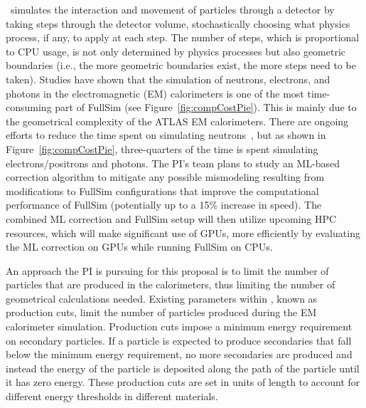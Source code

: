 \documentclass[letter, USenglish, 11pt, subfigure]{article}
\begin{document}
\GEANT\ simulates the interaction and movement of particles through a detector by taking steps through the detector volume, stochastically choosing what physics process, if any, to apply at each step. The number of steps, which is proportional to CPU usage, is not only determined by physics processes but also geometric boundaries (i.e., the more geometric boundaries exist, the more steps need to be taken). Studies have shown that the simulation of neutrons, electrons, and photons in the electromagnetic (EM) calorimeters is one of the most time-consuming part of FullSim (see Figure~\ref{fig:compCostPie}). This is mainly due to the geometrical complexity of the ATLAS EM calorimeters. There are ongoing efforts to reduce the time spent on simulating neutrons~\cite{nrr}, but as shown in Figure~\ref{fig:compCostPie}, three-quarters of the time is spent simulating electrons/positrons and photons. The PI's team plans to study an ML-based correction algorithm to mitigate any possible mismodeling resulting from modifications to FullSim configurations that improve the computational performance of FullSim (potentially up to a 15\% increase in speed). The combined ML correction and FullSim setup will then utilize upcoming HPC resources, which will make significant use of GPUs, more efficiently by evaluating the ML correction on GPUs while running FullSim on CPUs.


An approach the PI is pursuing for this proposal is to limit the number of particles that are produced in the calorimeters, thus limiting the number of geometrical calculations needed. Existing parameters within \GEANT, known as production cuts, limit the number of particles produced during the EM calorimeter simulation. Production cuts impose a minimum energy requirement on secondary particles. If a particle is expected to produce secondaries that fall below the minimum energy requirement, no more secondaries are produced and instead the energy of the particle is deposited along the path of the particle until it has zero energy. These production cuts are set in units of length to account for different energy thresholds in different materials. 
\end{document}
